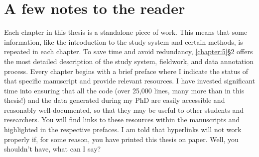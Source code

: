 \section{A few notes to the reader}
Each chapter in this thesis is a standalone piece of work. This means that some information, like the introduction to the study system and certain methods, is repeated in each chapter. To save time and avoid redundancy, \autoref{chapter:5}§2 offers the most detailed description of the study system, fieldwork, and data annotation process.
Every chapter begins with a brief preface where I indicate the status of that specific manuscript and provide relevant resources. I have invested significant time into ensuring that all the code (over 25,000 lines, many more than in this thesis!) and the data generated during my PhD are easily accessible and reasonably well-documented, so that they may be useful to other students and researchers. You will find links to these resources within the manuscripts and highlighted in the respective prefaces.
I am told that hyperlinks will not work properly if, for some reason, you have printed this thesis on paper. Well, you shouldn’t have, what can I say?

\renewcommand{\cleardoublepage}{}
\renewcommand{\clearpage}{}
\printbibliography

